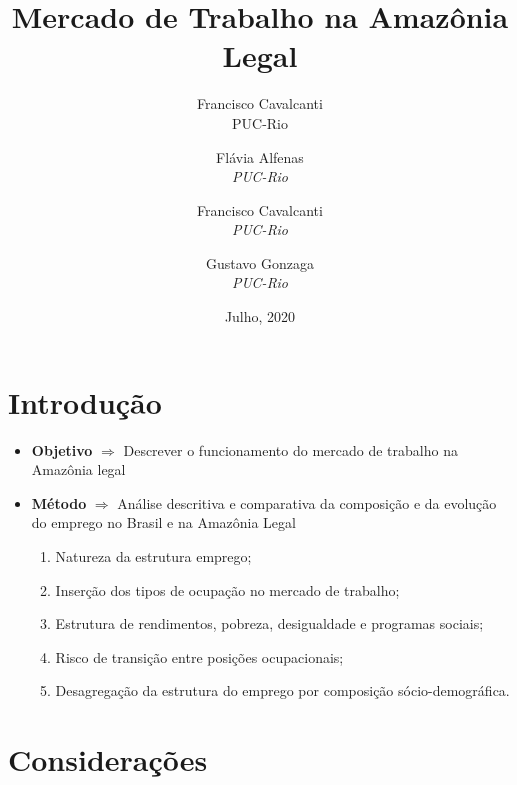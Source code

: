 \documentclass[11pt]{beamer}
\author[Francisco Cavalcanti]{Francisco Cavalcanti\\\footnotesize{PUC-Rio}
}
\author{
Flávia  Alfenas\\
\textit{PUC-Rio}\\ \vspace{3mm}
\and  
Francisco Cavalcanti\\
\textit{PUC-Rio}\\ \vspace{3mm}
\and   
Gustavo Gonzaga \\
\textit{PUC-Rio} 
}
\date{Julho, 2020}
\title{Mercado de Trabalho na Amazônia Legal}
\begin{document}

\begin{frame}
\titlepage
\end{frame}


\section{Introdução}


\begin{frame}{}
\begin{itemize}
	\item{\textbf{Objetivo} $\Rightarrow$ Descrever o funcionamento do mercado de trabalho na Amazônia legal} 
	\vspace{2mm}
	\item{\textbf{Método} $\Rightarrow$ Análise descritiva e comparativa da composição e da evolução do emprego no Brasil e na Amazônia Legal
	\vspace{1mm}
	\begin{enumerate}
		\item{Natureza da estrutura emprego;}
		\item{Inserção dos tipos de ocupação no mercado de trabalho;}
		\item{Estrutura de rendimentos, pobreza, desigualdade e programas sociais;}
		\item{Risco de transição entre posições ocupacionais;}
		\item{Desagregação da estrutura do emprego por composição sócio-demográfica.}
	\end{enumerate}
	}
\end{itemize}
\end{frame}

\section{Considerações}
\end{document}
